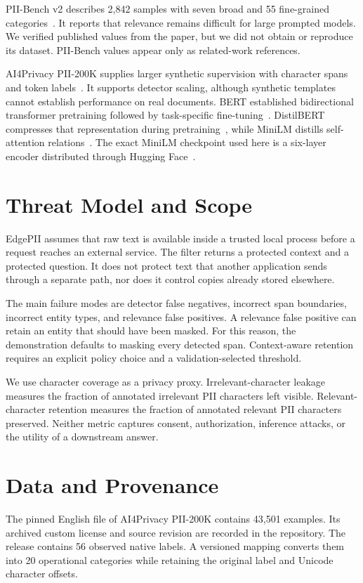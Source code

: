 \documentclass[conference]{IEEEtran}
\begin{document}
PII-Bench v2 describes 2,842 samples with seven broad and 55 fine-grained categories~\cite{piibench}. It reports that relevance remains difficult for large prompted models. We verified published values from the paper, but we did not obtain or reproduce its dataset. PII-Bench values appear only as related-work references.

AI4Privacy PII-200K supplies larger synthetic supervision with character spans and token labels~\cite{ai4privacy}. It supports detector scaling, although synthetic templates cannot establish performance on real documents. BERT established bidirectional transformer pretraining followed by task-specific fine-tuning~\cite{bertpaper}. DistilBERT compresses that representation during pretraining~\cite{distilbertpaper}, while MiniLM distills self-attention relations~\cite{minilmpaper}. The exact MiniLM checkpoint used here is a six-layer encoder distributed through Hugging Face~\cite{minilm}.

\section{Threat Model and Scope}
EdgePII assumes that raw text is available inside a trusted local process before a request reaches an external service. The filter returns a protected context and a protected question. It does not protect text that another application sends through a separate path, nor does it control copies already stored elsewhere.

The main failure modes are detector false negatives, incorrect span boundaries, incorrect entity types, and relevance false positives. A relevance false positive can retain an entity that should have been masked. For this reason, the demonstration defaults to masking every detected span. Context-aware retention requires an explicit policy choice and a validation-selected threshold.

We use character coverage as a privacy proxy. Irrelevant-character leakage measures the fraction of annotated irrelevant PII characters left visible. Relevant-character retention measures the fraction of annotated relevant PII characters preserved. Neither metric captures consent, authorization, inference attacks, or the utility of a downstream answer.

\section{Data and Provenance}
The pinned English file of AI4Privacy PII-200K contains 43,501 examples. Its archived custom license and source revision are recorded in the repository. The release contains 56 observed native labels. A versioned mapping converts them into 20 operational categories while retaining the original label and Unicode character offsets.
\end{document}
